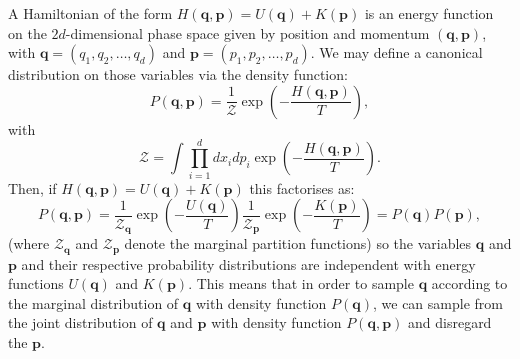 \documentclass[12pt]{article}
\begin{document}
            A Hamiltonian of the form $H\left(\bm{q},\bm{p}\right)=U\left(\bm{q}\right)+K\left(\bm{p}\right)$ is an energy function on the $2d$-dimensional phase space given by position and momentum $\left(\bm{q},\bm{p}\right)$, with $\bm{q} = \left(q_{1},q_{2},\dots,q_{d}\right)$ and $\bm{p} = \left(p_{1},p_{2},\dots,p_{d}\right)$. We may define a canonical distribution on those variables via the density function:
            \begin{equation}
                \label{eq:BoltzmannDistributionXP}
                P\left(\bm{q},\bm{p}\right) = \frac{1}{\mathcal{Z}}\exp{\left(-\frac{H\left(\bm{q},\bm{p}\right)}{T} \right)},
            \end{equation}
            with 
            \begin{equation}
                \mathcal{Z} = \int\prod_{i=1}^{d}dx_{i}dp_{i} \exp{\left(-\frac{H\left(\bm{q},\bm{p}\right)}{T}\right)}.
            \end{equation}
            Then, if $H\left(\bm{q},\bm{p}\right) = U\left(\bm{q}\right) + K\left(\bm{p}\right)$ this factorises as:
            \begin{equation}
                \label{eq:BoltzmannDistributionXPFactorised}
                P\left(\bm{q},\bm{p}\right) = \frac{1}{\mathcal{Z}_{\bm{q}}}\exp{\left(-\frac{U\left(\bm{q}\right)}{T} \right)}\frac{1}{\mathcal{Z}_{\bm{p}}}\exp{\left(-\frac{K\left(\bm{p}\right)}{T} \right)} = P\left(\bm{q}\right) P\left(\bm{p}\right),
            \end{equation}
            (where $\mathcal{Z}_{\bm{q}}$ and $\mathcal{Z}_{\bm{p}}$ denote the marginal partition functions) so the variables $\bm{q}$ and $\bm{p}$ and their respective probability distributions are independent with energy functions $U\left(\bm{q}\right)$ and $K\left(\bm{p}\right)$. This means that in order to sample $\bm{q}$ according to the marginal distribution of $\bm{q}$ with density function $P\left(\bm{q}\right)$, we can sample from the joint distribution of $\bm{q}$ and $\bm{p}$ with density function $P\left(\bm{q},\bm{p}\right)$ and disregard the $\bm{p}$. 
\end{document}
